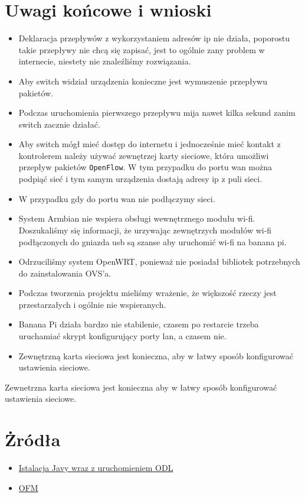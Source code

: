 \documentclass[12pt,a4paper,twoside]{article}
\begin{document}
\section{Uwagi końcowe i wnioski}
\begin{itemize}
	\item Deklaracja przepływów z wykorzystaniem adresów ip nie działa, poporostu takie przepływy nie chcą się zapisać, jest to ogólnie zany problem w internecie, niestety nie znaleźliśmy rozwiązania. 
	\item Aby switch widział urządzenia konieczne jest wymuszenie przepływu pakietów.
	\item Podczas uruchomienia pierwszego przepływu mija nawet kilka sekund zanim switch zacznie działać.
	\item Aby switch mógł mieć dostęp do internetu i jednocześnie mieć kontakt z kontrolerem należy używać zewnętrzej karty sieciowe, która umożliwi przepływ pakietów \texttt{OpenFlow}. W tym przypadku do portu wan można podpiąć sieć i tym samym urządzenia dostają adresy ip z puli sieci.
	\item W przypadku gdy do portu wan nie podłączymy sieci.
	\item System Armbian nie wspiera obsługi wewnętrznego modułu wi-fi. Doszukaliśmy się informacji, że urzywając zewnętrzych modułów wi-fi podłączonych do gniazda usb są szanse aby uruchomić wi-fi na banana pi. 
	\item Odrzuciliśmy system OpenWRT, ponieważ nie posiadał bibliotek potrzebnych do zainstalowania OVS'a.
	\item Podczas tworzenia projektu mieliśmy wrażenie, że większość rzeczy jest przestarzałych i ogólnie nie wspieranych.
	\item Banana Pi działa bardzo nie stabilenie, czasem po restarcie trzeba uruchamiać skrypt konfigurujący porty lan, a czasem nie.
	\item Zewnętrzną karta sieciowa jest konieczna, aby w łatwy sposób konfigurować ustawienia sieciowe.
	
\end{itemize}

Zewnetrzna karta sieciowa jest konieczna aby w łatwy sposób konfigurować ustawienia sieciowe. 

\section*{Żródła}

\begin{itemize}
	\item \href{https://john.soban.ski/install-opendaylight-ubuntu-lts-fast.html}{Istalacja Javy wraz z uruchomieniem ODL}
	\item \href{https://github.com/CiscoDevNet/OpenDaylight-Openflow-App}{OFM}
\end{itemize}
\end{document}

